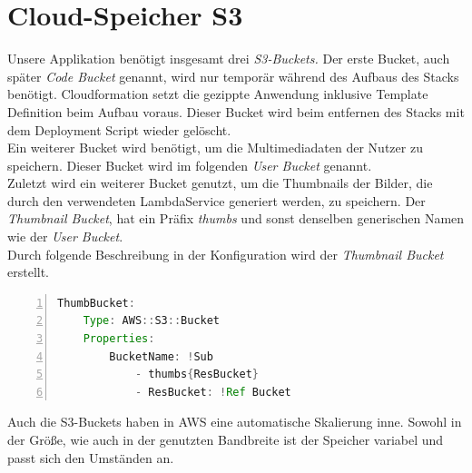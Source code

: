 \documentclass[a4paper, 12pt]{scrreprt}
\renewcommand\_{\textunderscore\allowbreak}
\begin{document}
\section{Cloud-Speicher S3}
Unsere Applikation benötigt insgesamt drei \textit{S3-Buckets.} Der erste Bucket, auch später \textit{Code Bucket} genannt, wird nur temporär während des Aufbaus des Stacks benötigt. Cloudformation setzt die gezippte Anwendung inklusive Template Definition beim Aufbau voraus. Dieser Bucket wird beim entfernen des Stacks mit dem Deployment Script wieder gelöscht. \\
Ein weiterer Bucket wird benötigt, um die Multimediadaten der Nutzer zu speichern. Dieser Bucket wird im folgenden \textit{User Bucket} genannt. \\
Zuletzt wird ein weiterer Bucket genutzt, um die Thumbnails der Bilder, die durch den verwendeten LambdaService generiert werden, zu speichern. Der \textit{Thumbnail Bucket}, hat ein Präfix \textit{thumbs} und sonst denselben generischen Namen wie der \textit{User Bucket}. \\
Durch folgende Beschreibung in der Konfiguration wird der \textit{Thumbnail Bucket} erstellt.
\bigskip
\begin{lstlisting}[xleftmargin=\parindent,numbers=left,numberstyle=\small,numbersep=8pt,frame=L,mathescape=true, basicstyle=\small, language=Java, lineskip={1.0pt}]
ThumbBucket:
    Type: AWS::S3::Bucket
    Properties:
        BucketName: !Sub
            - thumbs{ResBucket}
            - ResBucket: !Ref Bucket
\end{lstlisting}     
\bigskip     
Auch die S3-Buckets haben in AWS eine automatische Skalierung inne. Sowohl in der Größe, wie auch in der genutzten Bandbreite ist der Speicher variabel und passt sich den Umständen an.
\end{document}
